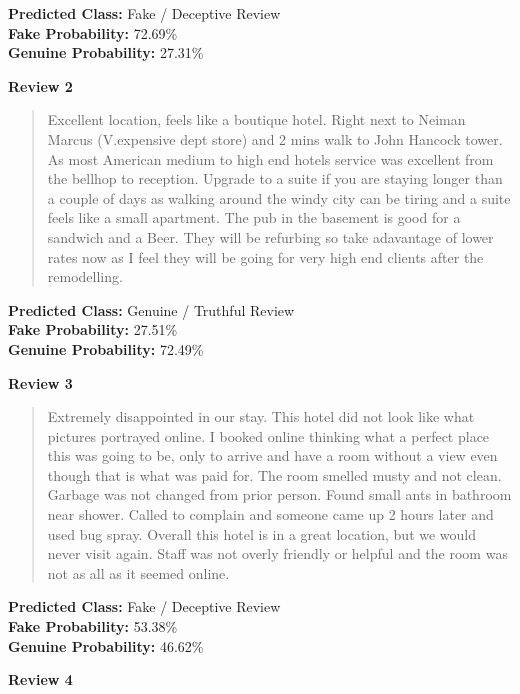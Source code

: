 \documentclass[12pt,a4paper]{report}
\begin{document}
\noindent
\textbf{Predicted Class:} Fake / Deceptive Review \\
\textbf{Fake Probability:} 72.69\% \\
\textbf{Genuine Probability:} 27.31\%

\vspace{0.5cm}
\noindent\textbf{Review 2}

\begin{quote}
Excellent location, feels like a boutique hotel. Right next to Neiman
Marcus (V.expensive dept store) and 2 mins walk to John Hancock tower.
As most American medium to high end hotels service was excellent from
the bellhop to reception. Upgrade to a suite if you are staying longer
than a couple of days as walking around the windy city can be tiring
and a suite feels like a small apartment. The pub in the basement is
good for a sandwich and a Beer. They will be refurbing so take
adavantage of lower rates now as I feel they will be going for very
high end clients after the remodelling.
\end{quote}

\noindent
\textbf{Predicted Class:} Genuine / Truthful Review \\
\textbf{Fake Probability:} 27.51\% \\
\textbf{Genuine Probability:} 72.49\%

\newpage

\vspace{0.5cm}
\noindent\textbf{Review 3}

\begin{quote}
Extremely disappointed in our stay. This hotel did not look like what
pictures portrayed online. I booked online thinking what a perfect
place this was going to be, only to arrive and have a room without a
view even though that is what was paid for. The room smelled musty and
not clean. Garbage was not changed from prior person. Found small ants
in bathroom near shower. Called to complain and someone came up 2
hours later and used bug spray. Overall this hotel is in a great
location, but we would never visit again. Staff was not overly
friendly or helpful and the room was not as all as it seemed online.
\end{quote}

\noindent
\textbf{Predicted Class:} Fake / Deceptive Review \\
\textbf{Fake Probability:} 53.38\% \\
\textbf{Genuine Probability:} 46.62\%

\vspace{0.5cm}
\noindent\textbf{Review 4}
\end{document}
